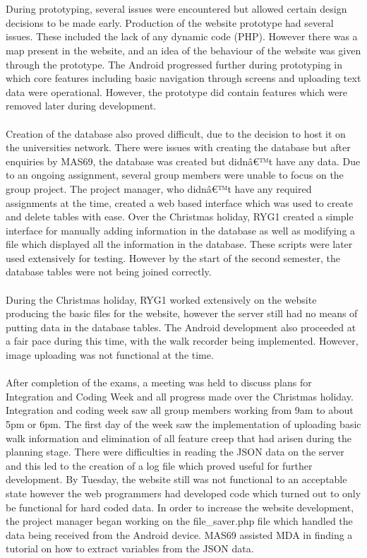 \documentclass[12pt]{article}
\begin{document}
\\\\
During prototyping, several issues were encountered but allowed certain design decisions to be made early. Production of the website prototype had several issues. These included the lack of any dynamic code (PHP). However there was a map present in the website, and an idea of the behaviour of the website was given through the prototype. The Android progressed further during prototyping in which core features including basic navigation through screens and uploading text data were operational. However, the prototype did contain features which were removed later during development.
\\\\
Creation of the database also proved difficult, due to the decision to host it on the universities network. There were issues with creating the database but after enquiries by MAS69, the database was created but didnâ€™t have any data. Due to an ongoing assignment, several group members were unable to focus on the group project. The project manager, who didnâ€™t have any required assignments at the time, created a web based interface which was used to create and delete tables with ease. Over the Christmas holiday, RYG1 created a simple interface for manually adding information in the database as well as modifying a file which displayed all the information in the database. These scripts were later used extensively for testing. However by the start of the second semester, the database tables were not being joined correctly.
\\\\
During the Christmas holiday, RYG1 worked extensively on the website producing the basic files for the website, however the server still had no means of putting data in the database tables. The Android development also proceeded at a fair pace during this time, with the walk recorder being implemented. However, image uploading was not functional at the time. 
\\\\
After completion of the exams, a meeting was held to discuss plans for Integration and Coding Week and all progress made over the Christmas holiday. Integration and coding week saw all group members working from 9am to about 5pm or 6pm. The first day of the week saw the implementation of uploading basic walk information and elimination of all feature creep that had arisen during the planning stage. There were difficulties in reading the JSON data on the server and this led to the creation of a log file which proved useful for further development. By Tuesday, the website still was not functional to an acceptable state however the web programmers had developed code which turned out to only be functional for hard coded data. In order to increase the website development, the project manager began working on the file\_saver.php file which handled the data being received from the Android device. MAS69 assisted MDA in finding a tutorial on how to extract variables from the JSON data. 
\end{document}
